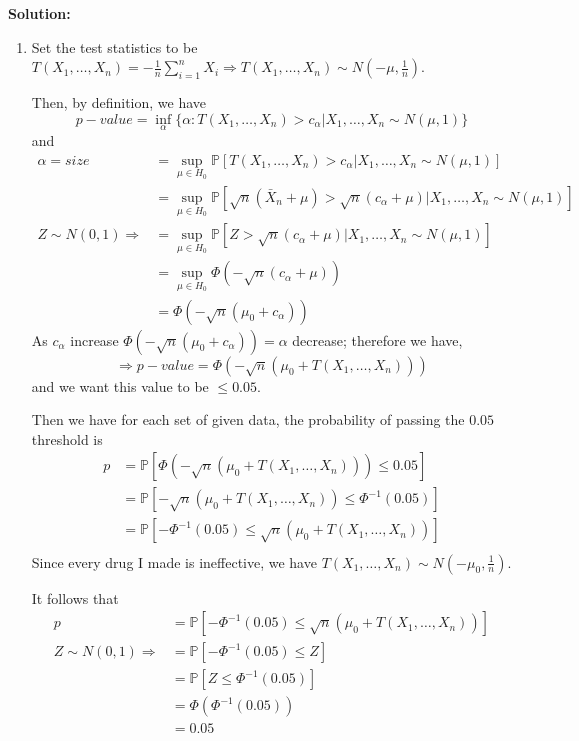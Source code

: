 \documentclass[13pt]{article}
\theoremstyle{definition}
\newenvironment{solution}
{\color{C2}\begin{framed}\begingroup\textbf{Solution:} }
  {\endgroup\end{framed}}
\theoremstyle{remark}
\newcommand{\PP}{\mathbb{P}}
\begin{document}
\begin{solution}
\begin{enumerate}[label=(\alph*),topsep=0pt]
    \item Set the test statistics to be $T(X_1, \ldots, X_n) = -\frac{1}{n}\sum_{i=1}^n X_i\Longrightarrow T(X_1, \ldots, X_n) \sim N(-\mu, \frac{1}{n})$.
    
    Then, by definition, we have
    \[
    p-value = \inf_{\alpha}\{\alpha:T(X_1, \ldots, X_n)>c_{\alpha}\Big|X_1, \ldots, X_n\sim N(\mu, 1)\}
    \]
    and 
    \begin{align*}
    \alpha = size &= \sup_{\mu\in H_0} \PP[T(X_1, \ldots, X_n)>c_{\alpha}\Big|X_1, \ldots, X_n\sim N(\mu, 1)]\\
    &= \sup_{\mu\in H_0} \PP[\sqrt{n}(\bar{X}_n+\mu)>\sqrt{n}(c_{\alpha}+\mu)\Big|X_1, \ldots, X_n\sim N(\mu, 1)]\\
    Z\sim N(0,1)\Longrightarrow &= \sup_{\mu\in H_0} \PP[Z>\sqrt{n}(c_{\alpha}+\mu)\Big|X_1, \ldots, X_n\sim N(\mu, 1)]\\
    &= \sup_{\mu\in H_0} \Phi(-\sqrt{n}(c_{\alpha}+\mu))\\
    &= \Phi(-\sqrt{n}(\mu_0+c_{\alpha}))
    \end{align*}
    As $c_{\alpha}$ increase $\Phi(-\sqrt{n}(\mu_0+c_{\alpha}))=\alpha$ decrease; therefore we have,
    \[
    \Longrightarrow p-value =\Phi\left(-\sqrt{n}(\mu_0+T(X_1, \ldots, X_n))\right)
    \]
    and we want this value to be $\le 0.05$.
    
    Then we have for each set of given data, the probability of passing the $0.05$ threshold is
    \begin{align*}
        p &= \PP\left[\Phi\left(-\sqrt{n}(\mu_0+T(X_1, \ldots, X_n))\right)\le 0.05\right]\\
        &= \PP\left[-\sqrt{n}(\mu_0+T(X_1, \ldots, X_n))\le \Phi^{-1}(0.05)\right]\\
        &= \PP\left[-\Phi^{-1}(0.05)\le \sqrt{n}(\mu_0+T(X_1, \ldots, X_n)) \right]\\
    \end{align*}
    Since every drug I made is ineffective, we have $T(X_1, \ldots, X_n) \sim N(-\mu_0, \frac{1}{n})$.
    
    It follows that
     \begin{align*}
        p &= \PP\left[-\Phi^{-1}(0.05)\le \sqrt{n}(\mu_0+T(X_1, \ldots, X_n)) \right]\\
        Z\sim N(0,1) \Longrightarrow &= \PP\left[-\Phi^{-1}(0.05)\le Z \right]\\
        &= \PP\left[Z\le \Phi^{-1}(0.05) \right]\\
        &= \Phi\left(\Phi^{-1}(0.05) \right)\\
        &= 0.05\\
    \end{align*}
    

\end{enumerate}
\end{solution}
\end{document}

